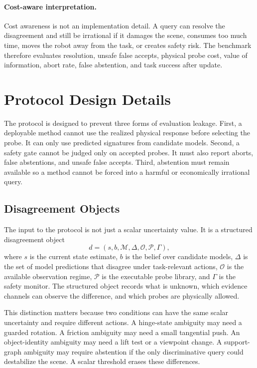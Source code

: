 \documentclass{article}
\newcommand{\modelset}{\mathcal{M}}
\newcommand{\obs}{\mathcal{O}}
\begin{document}
\paragraph{Cost-aware interpretation.}
Cost awareness is not an implementation detail. A query can resolve the disagreement and still be irrational if it damages the scene, consumes too much time, moves the robot away from the task, or creates safety risk. The benchmark therefore evaluates resolution, unsafe false accepts, physical probe cost, value of information, abort rate, false abstention, and task success after update.

\section{Protocol Design Details}

The protocol is designed to prevent three forms of evaluation leakage. First, a deployable method cannot use the realized physical response before selecting the probe. It can only use predicted signatures from candidate models. Second, a safety gate cannot be judged only on accepted probes. It must also report aborts, false abstentions, and unsafe false accepts. Third, abstention must remain available so a method cannot be forced into a harmful or economically irrational query.

\subsection{Disagreement Objects}

The input to the protocol is not just a scalar uncertainty value. It is a structured disagreement object
\[
    d = (s, b, \modelset, \Delta, \obs, \mathcal{P}, \Gamma),
\]
where $s$ is the current state estimate, $b$ is the belief over candidate models, $\Delta$ is the set of model predictions that disagree under task-relevant actions, $\obs$ is the available observation regime, $\mathcal{P}$ is the executable probe library, and $\Gamma$ is the safety monitor. The structured object records what is unknown, which evidence channels can observe the difference, and which probes are physically allowed.

This distinction matters because two conditions can have the same scalar uncertainty and require different actions. A hinge-state ambiguity may need a guarded rotation. A friction ambiguity may need a small tangential push. An object-identity ambiguity may need a lift test or a viewpoint change. A support-graph ambiguity may require abstention if the only discriminative query could destabilize the scene. A scalar threshold erases these differences.
\end{document}
